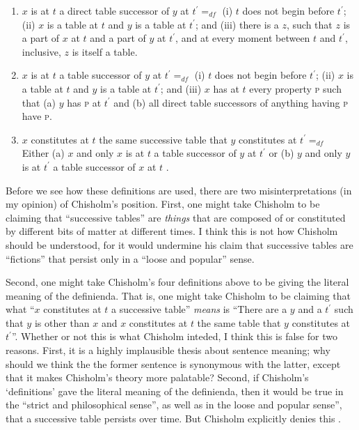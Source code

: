 \documentclass[11pt]{article}
\begin{document}
\begin{spacing}{1.5}
\begin{enumerate}[ref=\arabic*]
  \item $x$ is at $t$ a direct table successor of $y$ at $t^{\prime}
    =_{df}$ (i) $t$ does not begin before $t^{\prime}$; (ii) $x$ is a
    table at $t$ and $y$ is a table at $t^{\prime}$; and (iii) there
    is a $z$, such that $z$ is a part of $x$ at $t$ and a part of $y$
    at $t^{\prime}$, and at every moment between $t$ and $t^{\prime}$,
    inclusive, $z$ is itself a table. \label{suc1}
  \item $x$ is at $t$ a table successor of $y$ at $t^{\prime} =_{df}$
    (i) $t$ does not begin before $t^{\prime}$; (ii) $x$ is a table at
    $t$ and $y$ is a table at $t^{\prime}$; and (iii) $x$ has at $t$
    every property \textsc{p} such that (a) $y$ has \textsc{p} at
    $t^{\prime}$ and (b) all direct table successors of anything
    having \textsc{p} have \textsc{p}. \label{suc2}
  \item $x$ constitutes at $t$ the same successive table that $y$
    constitutes at $t^{\prime} =_{df}$ Either (a) $x$ and only $x$ is
    at $t$ a table successor of $y$ at $t^{\prime}$ or (b) $y$ and
    only $y$ is at $t^{\prime}$ a table successor of $x$ at $t$
    \citep[99--100]{chisholm1979}. \label{suc3}
\end{enumerate}

Before we see how these definitions are used, there are two
misinterpretations (in my opinion) of Chisholm's position.  First, one
might take Chisholm to be claiming that ``successive tables'' are {\em
  things} that are composed of or constituted by different bits of
matter at different times.  I think this is not how Chisholm should be
understood, for it would undermine his claim that successive tables
are ``fictions'' that persist only in a ``loose and popular'' sense.

Second, one might take Chisholm's four definitions above to be giving
the literal meaning of the definienda.  That is, one might take
Chisholm to be claiming that what ``$x$ constitutes at $t$ a
successive table'' {\em means} is ``There are a $y$ and a $t^{\prime}$
such that $y$ is other than $x$ and $x$ constitutes at $t$ the same
table that $y$ constitutes at $t^{\prime}$''.  Whether or not this is
what Chisholm inteded, I think this is false for two reasons.  First,
it is a highly implausible thesis about sentence meaning; why should
we think the the former sentence is synonymous with the latter, except
that it makes Chisholm's theory more palatable?  Second, if Chisholm's
`definitions' gave the literal meaning of the definienda, then it
would be true in the ``strict and philosophical sense'', as well as in
the loose and popular sense'', that a successive table persists over
time.  But Chisholm explicitly denies this
\citeyearpar[96--97]{chisholm1979}.


\end{spacing}
\end{document}
